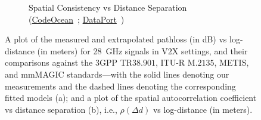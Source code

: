 \documentclass[10pt, twocolumn]{IEEEtran}
\begin{document}
{\begin{figure} [t]
\begin{subfigure}{0.5\linewidth}
        \caption{Spatial Consistency vs Distance Separation (\href{https://codeocean.com/capsule/9545863/tree}{CodeOcean}~\cite{CodeOcean}; \href{http://ieee-dataport.org/12580}{DataPort}~\cite{DataPort})}
        \label{F7b}
    \end{subfigure}
    \vspace{-5mm}
    \caption{A plot of the measured and extrapolated pathloss (in dB) vs log-distance (in meters) for \SI{28}{\giga\hertz} signals in V$2$X settings, and their comparisons against the $3$GPP TR$38.901$, ITU-R M.$2135$, METIS, and mmMAGIC standards---with the solid lines denoting our measurements and the dashed lines denoting the corresponding fitted models (a); and a plot of the spatial autocorrelation coefficient vs distance separation (b), i.e., $\rho(\Delta d)$ vs log-distance (in meters).}
    \vspace{-5mm}
    \label{F7}
\end{figure}
}
\end{document}
